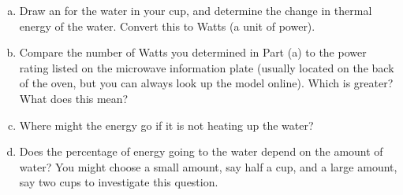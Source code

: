 \begin{enumerate}[(a)]
	\item Draw an \EnergyDiagram{} for the water in your cup, and determine the change in thermal energy of the water. Convert this to Watts (a unit of power).
	
	\item Compare the number of Watts you determined in Part (a) to the power rating listed on the microwave information plate (usually located on the back of the oven, but you can always look up the model online). Which is greater? What does this mean?
	
	\item Where might the energy go if it is not heating up the water?
	
	\item Does the percentage of energy going to the water depend on the amount of water? You might choose a small amount, say half a cup, and a large amount, say two cups to investigate this question.
\end{enumerate}